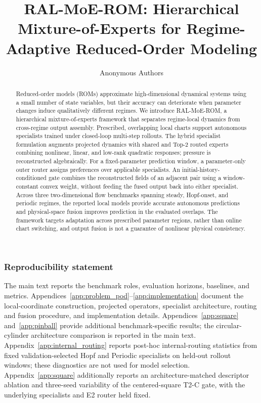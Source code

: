 \documentclass{article}
\title{RAL-MoE-ROM: Hierarchical Mixture-of-Experts for Regime-Adaptive Reduced-Order Modeling}
\author{Anonymous Authors}
\begin{document}
\raggedbottom

\maketitle

\begin{abstract}
Reduced-order models (ROMs) approximate high-dimensional dynamical systems using a small number of state variables, but their accuracy can deteriorate when parameter changes induce qualitatively different regimes. We introduce RAL-MoE-ROM, a hierarchical mixture-of-experts framework that separates regime-local dynamics from cross-regime output assembly. Prescribed, overlapping local charts support autonomous specialists trained under closed-loop multi-step rollouts. The hybrid specialist formulation augments projected dynamics with shared and Top-2 routed experts combining nonlinear, linear, and low-rank quadratic responses; pressure is reconstructed algebraically. For a fixed-parameter prediction window, a parameter-only outer router assigns preferences over applicable specialists. An initial-history-conditioned gate combines the reconstructed fields of an adjacent pair using a window-constant convex weight, without feeding the fused output back into either specialist. Across three two-dimensional flow benchmarks spanning steady, Hopf-onset, and periodic regimes, the reported local models provide accurate autonomous predictions and physical-space fusion improves prediction in the evaluated overlaps. The framework targets adaptation across prescribed parameter regions, rather than online chart switching, and output fusion is not a guarantee of nonlinear physical consistency.
\end{abstract}





\FloatBarrier


\subsubsection*{Reproducibility statement}
The main text reports the benchmark roles, evaluation horizons, baselines, and metrics. Appendices~\ref{app:problem_pod}--\ref{app:implementation} document the local-coordinate construction, projected operators, specialist architecture, routing and fusion procedure, and implementation details. Appendices~\ref{app:square} and~\ref{app:pinball} provide additional benchmark-specific results; the circular-cylinder architecture comparison is reported in the main text.
Appendix~\ref{app:internal_routing} reports post-hoc internal-routing statistics
from fixed validation-selected Hopf and Periodic specialists on held-out
rollout windows; these diagnostics are not used for model selection.
Appendix~\ref{app:square} additionally reports an architecture-matched descriptor
ablation and three-seed variability of the centered-square T2-C gate, with the
underlying specialists and E2 router held fixed.
\end{document}
